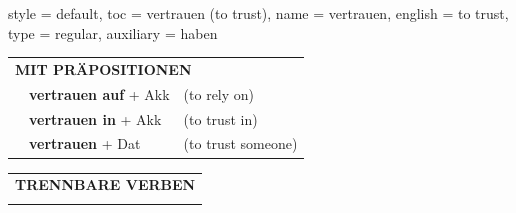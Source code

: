 \begin{verbentry}{
  style = {default},
  toc = {vertrauen (to trust)},
  name = {vertrauen},
  english = {to trust},
  type = {regular},
  auxiliary = {haben}
}
\vspace{10pt}

\begin{tabular}{lll}
\multicolumn{3}{l}{\textbf{MIT PRÄPOSITIONEN}}\\
& \textbf{vertrauen auf} + Akk & (to rely on)\\
& \textbf{vertrauen in} + Akk & (to trust in)\\
& \textbf{vertrauen} + Dat & (to trust someone)\\
\end{tabular}
\hfill
\begin{tabular}{lll}
\multicolumn{3}{l}{\textbf{TRENNBARE VERBEN}}\\
\vspace{30pt}\\
\end{tabular}
\vspace{-5pt}
\end{verbentry}

